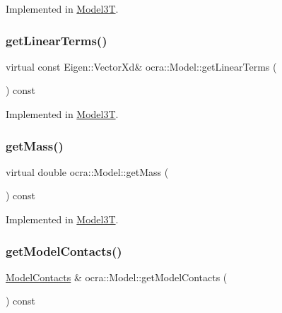 Implemented in \hyperlink{classModel3T_adb503d550d97093a65f19e55725865ca}{Model3T}.

\hypertarget{classocra_1_1Model_a0f9c628cb9e77d63744ccfd164e9beed}{}\label{classocra_1_1Model_a0f9c628cb9e77d63744ccfd164e9beed} 
\subsubsection{\texorpdfstring{get\+Linear\+Terms()}{getLinearTerms()}}
{\footnotesize\ttfamily virtual const Eigen\+::\+Vector\+Xd\& ocra\+::\+Model\+::get\+Linear\+Terms (\begin{DoxyParamCaption}{ }\end{DoxyParamCaption}) const\hspace{0.3cm}{\ttfamily [pure virtual]}}



Implemented in \hyperlink{classModel3T_a82b4a52bc8bf966a57a31e54e3efb80c}{Model3T}.

\hypertarget{classocra_1_1Model_a6237f96c89946f6c09be38761f128f28}{}\label{classocra_1_1Model_a6237f96c89946f6c09be38761f128f28} 
\subsubsection{\texorpdfstring{get\+Mass()}{getMass()}}
{\footnotesize\ttfamily virtual double ocra\+::\+Model\+::get\+Mass (\begin{DoxyParamCaption}{ }\end{DoxyParamCaption}) const\hspace{0.3cm}{\ttfamily [pure virtual]}}



Implemented in \hyperlink{classModel3T_a226c740338e57180fafed23181d1ca85}{Model3T}.

\hypertarget{classocra_1_1Model_a47362fe2f99287f555bbdb186d021823}{}\label{classocra_1_1Model_a47362fe2f99287f555bbdb186d021823} 
\subsubsection{\texorpdfstring{get\+Model\+Contacts()}{getModelContacts()}}
{\footnotesize\ttfamily \hyperlink{classocra_1_1ModelContacts}{Model\+Contacts} \& ocra\+::\+Model\+::get\+Model\+Contacts (\begin{DoxyParamCaption}{ }\end{DoxyParamCaption}) const}



